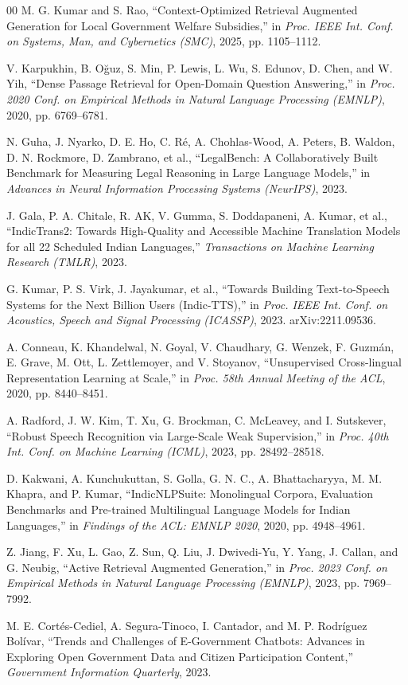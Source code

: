 \documentclass[conference]{IEEEtran}
\begin{document}
\begin{thebibliography}{00}
 M. G. Kumar and S. Rao, ``Context-Optimized Retrieval Augmented Generation for Local Government Welfare Subsidies,'' in \emph{Proc. IEEE Int. Conf. on Systems, Man, and Cybernetics (SMC)}, 2025, pp. 1105--1112.

 V. Karpukhin, B. O\u{g}uz, S. Min, P. Lewis, L. Wu, S. Edunov, D. Chen, and W. Yih, ``Dense Passage Retrieval for Open-Domain Question Answering,'' in \emph{Proc. 2020 Conf. on Empirical Methods in Natural Language Processing (EMNLP)}, 2020, pp. 6769--6781.

 N. Guha, J. Nyarko, D. E. Ho, C. R\'e, A. Chohlas-Wood, A. Peters, B. Waldon, D. N. Rockmore, D. Zambrano, et al., ``LegalBench: A Collaboratively Built Benchmark for Measuring Legal Reasoning in Large Language Models,'' in \emph{Advances in Neural Information Processing Systems (NeurIPS)}, 2023.

 J. Gala, P. A. Chitale, R. AK, V. Gumma, S. Doddapaneni, A. Kumar, et al., ``IndicTrans2: Towards High-Quality and Accessible Machine Translation Models for all 22 Scheduled Indian Languages,'' \emph{Transactions on Machine Learning Research (TMLR)}, 2023.

 G. Kumar, P. S. Virk, J. Jayakumar, et al., ``Towards Building Text-to-Speech Systems for the Next Billion Users (Indic-TTS),'' in \emph{Proc. IEEE Int. Conf. on Acoustics, Speech and Signal Processing (ICASSP)}, 2023. arXiv:2211.09536.

 A. Conneau, K. Khandelwal, N. Goyal, V. Chaudhary, G. Wenzek, F. Guzm\'an, E. Grave, M. Ott, L. Zettlemoyer, and V. Stoyanov, ``Unsupervised Cross-lingual Representation Learning at Scale,'' in \emph{Proc. 58th Annual Meeting of the ACL}, 2020, pp. 8440--8451.

 A. Radford, J. W. Kim, T. Xu, G. Brockman, C. McLeavey, and I. Sutskever, ``Robust Speech Recognition via Large-Scale Weak Supervision,'' in \emph{Proc. 40th Int. Conf. on Machine Learning (ICML)}, 2023, pp. 28492--28518.

 D. Kakwani, A. Kunchukuttan, S. Golla, G. N. C., A. Bhattacharyya, M. M. Khapra, and P. Kumar, ``IndicNLPSuite: Monolingual Corpora, Evaluation Benchmarks and Pre-trained Multilingual Language Models for Indian Languages,'' in \emph{Findings of the ACL: EMNLP 2020}, 2020, pp. 4948--4961.

 Z. Jiang, F. Xu, L. Gao, Z. Sun, Q. Liu, J. Dwivedi-Yu, Y. Yang, J. Callan, and G. Neubig, ``Active Retrieval Augmented Generation,'' in \emph{Proc. 2023 Conf. on Empirical Methods in Natural Language Processing (EMNLP)}, 2023, pp. 7969--7992.

 M. E. Cort\'es-Cediel, A. Segura-Tinoco, I. Cantador, and M. P. Rodr\'iguez Bol\'ivar, ``Trends and Challenges of E-Government Chatbots: Advances in Exploring Open Government Data and Citizen Participation Content,'' \emph{Government Information Quarterly}, 2023.

\end{thebibliography}
\end{document}

